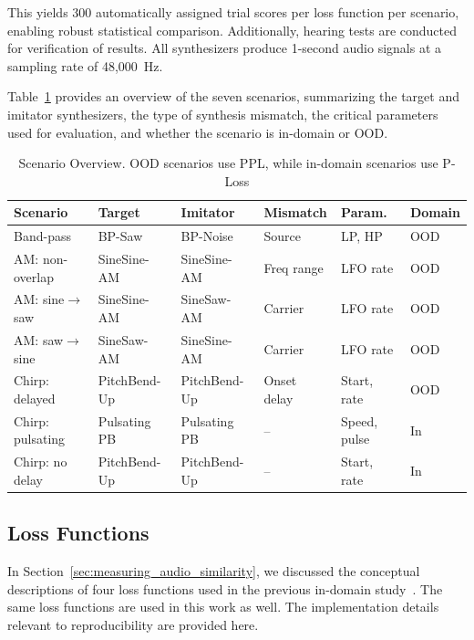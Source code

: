 \documentclass[10pt]{article} %
\begin{document}
This yields 300 automatically assigned trial scores per loss function per scenario, enabling robust statistical comparison. Additionally, hearing tests are conducted for verification of results. All synthesizers produce 1-second audio signals at a sampling rate of 48{,}000~Hz.

Table~\ref{tab:scenario_overview} provides an overview of the seven scenarios, summarizing the target and imitator synthesizers, the type of synthesis mismatch, the critical parameters used for evaluation, and whether the scenario is in-domain or OOD. 


\begin{table}[t]
\centering
\caption{Scenario Overview. OOD scenarios use PPL, while in-domain scenarios use P-Loss}
\label{tab:scenario_overview}
\setlength{\tabcolsep}{3pt}
\renewcommand{\arraystretch}{1.1}
\begin{tabular}{llllll}
\hline
\textbf{Scenario} &
\textbf{Target} &
\textbf{Imitator} &
\textbf{Mismatch} &
\textbf{Param.} &
\textbf{Domain} \\
\hline
Band-pass & BP-Saw & BP-Noise & Source & LP, HP & OOD \\
AM: non-overlap & SineSine-AM & SineSine-AM & Freq range & LFO rate & OOD \\
AM: sine$\rightarrow$saw & SineSine-AM & SineSaw-AM & Carrier & LFO rate & OOD \\
AM: saw$\rightarrow$sine & SineSaw-AM & SineSine-AM & Carrier & LFO rate & OOD \\
Chirp: delayed & PitchBend-Up & PitchBend-Up & Onset delay & Start, rate & OOD \\
Chirp: pulsating & Pulsating PB & Pulsating PB & -- & Speed, pulse & In \\
Chirp: no delay & PitchBend-Up & PitchBend-Up & -- & Start, rate & In \\
\hline
\end{tabular}
\end{table}


\subsection{Loss Functions}
\label{subsec:loss_functions}
In Section~\ref{sec:measuring_audio_similarity}, we discussed the conceptual descriptions of four loss functions used in the previous in-domain study~\cite{salimi2025evaluating}. The same loss functions are used in this work as well. The implementation details relevant to reproducibility are provided here.
\end{document}
